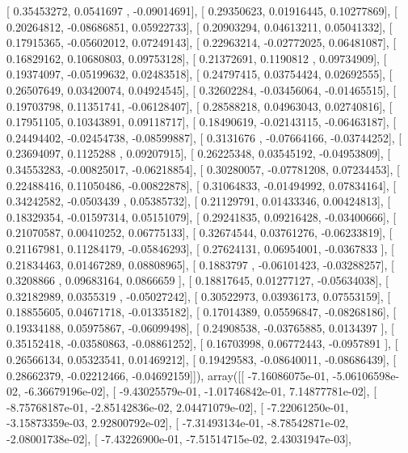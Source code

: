 \documentclass{article}
\begin{document}
       [ 0.35453272,  0.0541697 , -0.09014691],
       [ 0.29350623,  0.01916445,  0.10277869],
       [ 0.20264812, -0.08686851,  0.05922733],
       [ 0.20903294,  0.04613211,  0.05041332],
       [ 0.17915365, -0.05602012,  0.07249143],
       [ 0.22963214, -0.02772025,  0.06481087],
       [ 0.16829162,  0.10680803,  0.09753128],
       [ 0.21372691,  0.1190812 ,  0.09734909],
       [ 0.19374097, -0.05199632,  0.02483518],
       [ 0.24797415,  0.03754424,  0.02692555],
       [ 0.26507649,  0.03420074,  0.04924545],
       [ 0.32602284, -0.03456064, -0.01465515],
       [ 0.19703798,  0.11351741, -0.06128407],
       [ 0.28588218,  0.04963043,  0.02740816],
       [ 0.17951105,  0.10343891,  0.09118717],
       [ 0.18490619, -0.02143115, -0.06463187],
       [ 0.24494402, -0.02454738, -0.08599887],
       [ 0.3131676 , -0.07664166, -0.03744252],
       [ 0.23694097,  0.1125288 ,  0.09207915],
       [ 0.26225348,  0.03545192, -0.04953809],
       [ 0.34553283, -0.00825017, -0.06218854],
       [ 0.30280057, -0.07781208,  0.07234453],
       [ 0.22488416,  0.11050486, -0.00822878],
       [ 0.31064833, -0.01494992,  0.07834164],
       [ 0.34242582, -0.0503439 ,  0.05385732],
       [ 0.21129791,  0.01433346,  0.00424813],
       [ 0.18329354, -0.01597314,  0.05151079],
       [ 0.29241835,  0.09216428, -0.03400666],
       [ 0.21070587,  0.00410252,  0.06775133],
       [ 0.32674544,  0.03761276, -0.06233819],
       [ 0.21167981,  0.11284179, -0.05846293],
       [ 0.27624131,  0.06954001, -0.0367833 ],
       [ 0.21834463,  0.01467289,  0.08808965],
       [ 0.1883797 , -0.06101423, -0.03288257],
       [ 0.3208866 ,  0.09683164,  0.0866659 ],
       [ 0.18817645,  0.01277127, -0.05634038],
       [ 0.32182989,  0.0355319 , -0.05027242],
       [ 0.30522973,  0.03936173,  0.07553159],
       [ 0.18855605,  0.04671718, -0.01335182],
       [ 0.17014389,  0.05596847, -0.08268186],
       [ 0.19334188,  0.05975867, -0.06099498],
       [ 0.24908538, -0.03765885,  0.0134397 ],
       [ 0.35152418, -0.03580863, -0.08861252],
       [ 0.16703998,  0.06772443, -0.0957891 ],
       [ 0.26566134,  0.05323541,  0.01469212],
       [ 0.19429583, -0.08640011, -0.08686439],
       [ 0.28662379, -0.02212466, -0.04692159]]), array([[ -7.16086075e-01,  -5.06106598e-02,  -6.36679196e-02],
       [ -9.43025579e-01,  -1.01746842e-01,   7.14877781e-02],
       [ -8.75768187e-01,  -2.85142836e-02,   2.04471079e-02],
       [ -7.22061250e-01,  -3.15873359e-03,   2.92800792e-02],
       [ -7.31493134e-01,  -8.78542871e-02,  -2.08001738e-02],
       [ -7.43226900e-01,  -7.51514715e-02,   2.43031947e-03],
\end{document}
